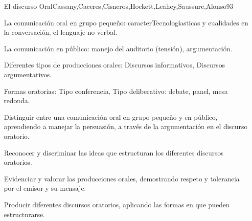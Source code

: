 \begin{syllabus}
\begin{unit}{El discurso Oral}{Cassany,Caceres,Cisneros,Hockett,Leahey,Saussure,Alonso}{9}{3}
\begin{topics}
   \item La comunicación oral en grupo pequeño: caracterTecnologíasticas y cualidades en la conversación, el lenguaje no  verbal.
   \item La comunicación en público: manejo del auditorio (tensión), argumentación.
   \item Diferentes tipos de producciones orales: Discursos informativos, Discursos argumentativos.
   \item Formas oratorias: Tipo conferencia, Tipo deliberativo: debate, panel, mesa redonda.
\end{topics}
\begin{learningoutcomes}
   \item Distinguir entre una comunicación oral en grupo pequeño y en público, aprendiendo a manejar la persuasión, a través de la argumentación en el discurso oratorio.
   \item Reconocer y discriminar las ideas que estructuran los diferentes discursos oratorios.
   \item Evidenciar y valorar las producciones orales, demostrando respeto y tolerancia por el emisor y su mensaje.
   \item Producir diferentes discursos oratorios, aplicando las formas en que pueden estructurarse.
\end{learningoutcomes}
\end{unit}



\begin{coursebibliography}
\end{coursebibliography}

\end{syllabus}

